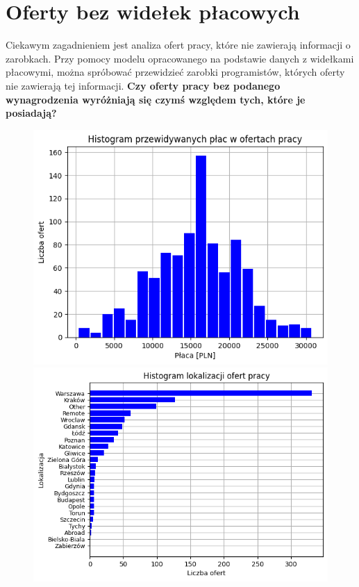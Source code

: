 \documentclass{article}
\begin{document}
\section{Oferty bez widełek płacowych}

Ciekawym zagadnieniem jest analiza ofert pracy, które nie zawierają informacji o zarobkach.
Przy pomocy modelu opracowanego na podstawie danych z widełkami płacowymi, można spróbować
przewidzieć zarobki programistów, których oferty nie zawierają tej informacji.
\textbf{Czy oferty pracy bez podanego wynagrodzenia wyróżniają się czymś względem tych, które je posiadają?}

\begin{figure}[h]
    \centering
    \begin{minipage}{0.45\textwidth}
        \centering
        \includegraphics[width=\textwidth]{img/zero_salary_hist.png}
    \end{minipage}
    \hfill
    \begin{minipage}{0.45\textwidth}
        \centering
        \includegraphics[width=\textwidth]{img/zero_location_hist.png}
    \end{minipage}
\end{figure}
\end{document}

